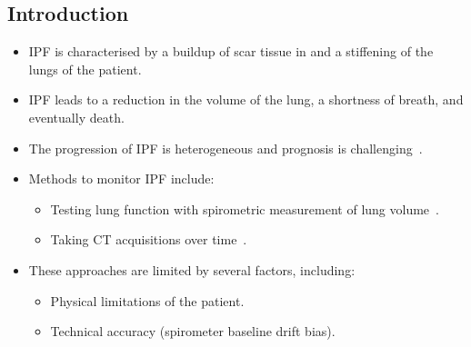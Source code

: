 \documentclass[landscape, color=UCLburgundy, margin=1cm]{uclposter}
\begin{document}
    \begin{multicols}{2}
        \begin{multicols}{2}
            \section*{Introduction}
                \begin{highlightbox}[UCLlightgreen]
                    \begin{itemize}
                        \item \gls{IPF} is characterised by a buildup of scar tissue in and a stiffening of the lungs of the patient.
                        
                        \item \gls{IPF} leads to a reduction in the volume of the lung, a shortness of breath, and eventually death.
                        
                        \item The progression of \gls{IPF} is heterogeneous and prognosis is challenging~\cite{King2011IdiopathicFibrosis}.
                        
                        \item Methods to monitor \gls{IPF} include:
    
                        \begin{itemize}
                            \item Testing lung function with spirometric measurement of lung volume~\cite{Watters1986AFibrosis}.
                            
                            \item Taking \gls{CT} acquisitions over time~\cite{Lynch2018DiagnosticPaper}.
                        \end{itemize}
                        
                        \item These approaches are limited by several factors, including:
    
                        \begin{itemize}
                            \item Physical limitations of the patient.
                            
                            \item Technical accuracy (spirometer baseline drift bias).
                            

\end{itemize}
\end{itemize}
\end{highlightbox}
\end{multicols}
\end{multicols}
\end{document}
